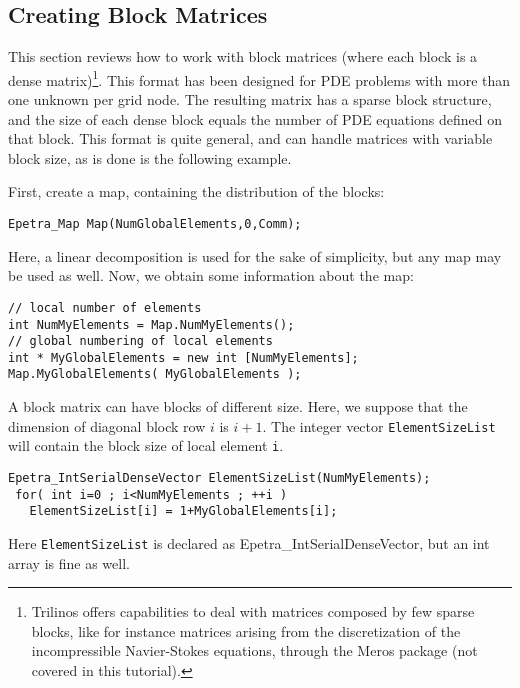 \subsection{Creating Block Matrices}
\label{sec:sparse_vbr}

This section reviews how to work with block matrices (where each block
is a dense matrix)\footnote{Trilinos offers capabilities to deal with
  matrices composed by few sparse blocks, like for instance matrices
  arising from the discretization of the incompressible Navier-Stokes
  equations, through the Meros package (not covered in this tutorial).}.
This format has been designed for PDE problems with more than one
unknown per grid node.  The resulting matrix has a sparse block
structure, and the size of each dense block equals the number of PDE
equations defined on that block.  This format is quite general, and can
handle matrices with variable block size, as is done is the following
example.

First, create a map, containing the distribution of the blocks:
\begin{verbatim}
Epetra_Map Map(NumGlobalElements,0,Comm);
\end{verbatim}
Here, a linear decomposition is used for the sake of simplicity, but any
map may be used as well.
Now, we obtain some information about the map:
\begin{verbatim}
// local number of elements
int NumMyElements = Map.NumMyElements();
// global numbering of local elements
int * MyGlobalElements = new int [NumMyElements];
Map.MyGlobalElements( MyGlobalElements );
\end{verbatim}
A block matrix can have blocks of different size.  Here, we suppose that
the dimension of diagonal block row $i$ is $i+1$.  The integer vector
\verb!ElementSizeList! will contain the block size of local element
\verb!i!.
\begin{verbatim}
Epetra_IntSerialDenseVector ElementSizeList(NumMyElements);
 for( int i=0 ; i<NumMyElements ; ++i ) 
   ElementSizeList[i] = 1+MyGlobalElements[i];
\end{verbatim}
Here \verb!ElementSizeList! is declared as Epetra\_IntSerialDenseVector,
but an int array is fine as well.

